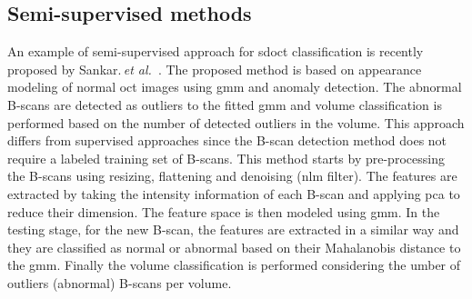 


\subsection{Semi-supervised methods}
An example of semi-supervised approach for \gls{sdoct} classification is recently proposed by Sankar.\,\textit{et al.}~\cite{sankar2016classification}. 
The proposed method is based on appearance modeling of normal \gls{oct} images using \gls{gmm} and anomaly detection. 
The abnormal B-scans are detected as outliers to the fitted \gls{gmm} and volume classification is performed based on the number of detected outliers in the volume. 
This approach differs from supervised approaches since the B-scan detection method does not require a labeled training set of B-scans. 
This method starts by pre-processing the B-scans using resizing, flattening and denoising (\gls{nlm} filter).
The features are extracted by taking the intensity information of each B-scan and applying \gls{pca} to reduce their dimension.
The feature space is then modeled using \gls{gmm}. 
In the testing stage, for the new B-scan, the features are extracted in a similar way and they are classified as normal or abnormal based on their Mahalanobis distance to the \gls{gmm}. 
Finally the volume classification is performed considering the umber of outliers (abnormal) B-scans per volume. 

